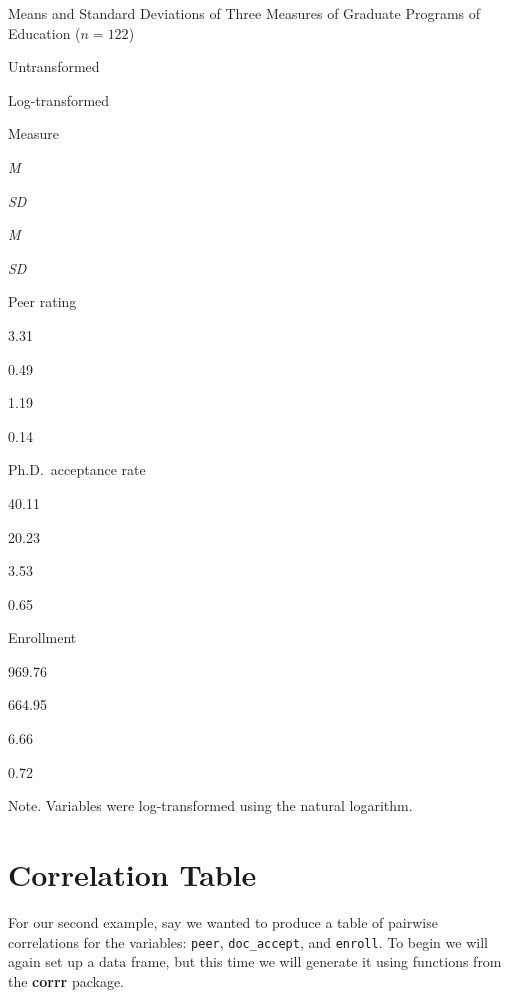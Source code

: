 \documentclass[]{book}
\newenvironment{Shaded}{\begin{snugshade}}{\end{snugshade}}
\newcommand{\DataTypeTok}[1]{\textcolor[rgb]{0.13,0.29,0.53}{#1}}
\newcommand{\DecValTok}[1]{\textcolor[rgb]{0.00,0.00,0.81}{#1}}
\newcommand{\KeywordTok}[1]{\textcolor[rgb]{0.13,0.29,0.53}{\textbf{#1}}}
\newcommand{\NormalTok}[1]{#1}
\newcommand{\OperatorTok}[1]{\textcolor[rgb]{0.81,0.36,0.00}{\textbf{#1}}}
\newcommand{\OtherTok}[1]{\textcolor[rgb]{0.56,0.35,0.01}{#1}}
\newcommand{\StringTok}[1]{\textcolor[rgb]{0.31,0.60,0.02}{#1}}
\begin{document}
\label{tab:unnamed-chunk-12}Means and Standard Deviations of Three Measures of Graduate Programs of Education (\(n=122\))

Untransformed

Log-transformed

Measure

\emph{M}

\emph{SD}

\emph{M}

\emph{SD}

Peer rating

3.31

0.49

1.19

0.14

Ph.D.~acceptance rate

40.11

20.23

3.53

0.65

Enrollment

969.76

664.95

6.66

0.72

{Note.} Variables were log-transformed using the natural logarithm.

\hypertarget{correlation-table}{%
\section*{Correlation Table}\label{correlation-table}}

For our second example, say we wanted to produce a table of pairwise correlations for the variables: \texttt{peer}, \texttt{doc\_accept}, and \texttt{enroll}. To begin we will again set up a data frame, but this time we will generate it using functions from the \textbf{corrr} package.

\begin{Shaded}
\end{Shaded}
\end{document}
